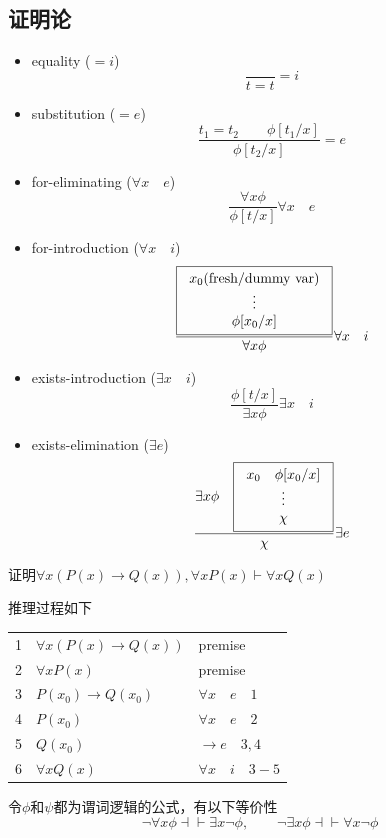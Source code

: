 \subsection{证明论}
\begin{itemize}
	\item equality ($=i$)
	\[\frac{}{t=t}=i\]
	\item substitution ($=e$)
	\[\frac{t_1=t_2\qquad \phi[t_1/x]}{\phi[t_2/x]}=e\]
	\item for-eliminating ($\forall x\quad e$)
	\[\frac{\forall x\phi}{\phi[t/x]}\forall x\quad e\]
	\item for-introduction ($\forall x\quad i$)
	\[\frac{\fbox{\begin{tabular}{c}$x_0$(fresh/dummy var)\\$\vdots$\\$\phi[x_0/x]$\end{tabular}}}{\forall x\phi}\forall x\quad i\]
	\item exists-introduction ($\exists x\quad i$)
	\[\frac{\phi[t/x]}{\exists x\phi}\exists x\quad i\]
	\item exists-elimination ($\exists e$)
	\[\frac{\exists x\phi\quad \fbox{\begin{tabular}{c}$x_0$\quad $\phi[x_0/x]$\\$\vdots$\\$\chi$\end{tabular}}}{\chi}\exists e\]
\end{itemize}
\begin{example}
证明$\forall x(P(x)\to Q(x)),\forall xP(x)\vdash\forall xQ(x)$
\end{example}
\begin{analysis}
推理过程如下
\begin{center}
\begin{tabular}{lll}
1 & $\forall x(P(x)\to Q(x))$ & premise\\
2 & $\forall xP(x)$ & premise\\
3 & $P(x_0)\to Q(x_0)$ & $\forall x\quad e\quad 1$\\
4 & $P(x_0)$ & $\forall x\quad e\quad 2$\\
5 & $Q(x_0)$ & $\to e\quad 3,4$\\
6 & $\forall xQ(x)$ & $\forall x\quad i\quad 3-5$
\end{tabular}
\end{center}
\end{analysis}
\begin{theorem}
令$\phi$和$\psi$都为谓词逻辑的公式，有以下等价性
\[\lnot\forall x\phi\dashv\vdash\exists x\lnot\phi,\qquad\lnot\exists x\phi\dashv\vdash\forall x\lnot\phi\]
\end{theorem}

